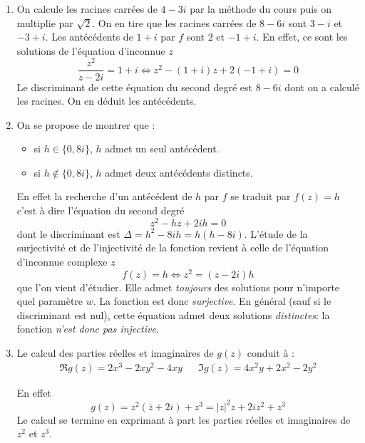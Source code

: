 \begin{enumerate}
 \item On calcule les racines carrées de $4-3i$ par la méthode du cours puis on multiplie par $\sqrt{2}$. On en tire que les racines carrées de $8-6i$ sont $3-i$ et $-3+i$.\newline
Les antécédents de $1+i$ par $f$ sont $2$ et $-1+i$.\newline
En effet, ce sont les solutions de l'équation d'inconnue $z$
\begin{displaymath}
 \frac{z^2}{z-2i}= 1+i \Leftrightarrow z^2 -(1+i)z +2(-1+i)=0
\end{displaymath}
Le discriminant de cette équation du second degré est $8-6i$ dont on a calculé les racines. On en déduit les antécédents.

\item On se propose de montrer que :
\begin{itemize}
 \item si $h\in\{0,8i\}$, $h$ admet un seul antécédent.
 \item si $h\not\in\{0,8i\}$, $h$ admet deux antécédents distincts.
\end{itemize}
En effet la recherche d'un antécédent de $h$ par $f$ se traduit par $f(z)=h$ c'est à dire l'équation du second degré
\begin{displaymath}
 z^2 -hz +2ih = 0
\end{displaymath}
dont le discriminant est $\Delta = h^2-8ih = h(h-8i)$.\newline
 L'étude de la surjectivité et de l'injectivité de la fonction revient à celle de l'équation d'inconnue complexe $z$
\begin{displaymath}
  f(z) = h \Leftrightarrow z^2 = (z-2i)h
\end{displaymath}
que l'on vient d'étudier. Elle admet \emph{toujours} des solutions pour n'importe quel paramètre $w$. La fonction est donc \emph{surjective}.\newline
En général (sauf si le discriminant est nul), cette équation admet deux solutions \emph{distinctes}: la fonction \emph{n'est donc pas injective}.

\item Le calcul des parties réelles et imaginaires de $g(z)$ conduit à :
\begin{align*}
 \Re g(z) =2x^3 -2xy^2-4xy & & \Im g(z) = 4x^2y +2x^2 -2y^2
\end{align*}

En effet
\begin{displaymath}
 g(z)= z^2(\overline{z}+2i)+z^3 = |z|^2z+2iz^2 +z^3
\end{displaymath}
Le calcul se termine en exprimant à part les parties réelles et imaginaires de $z^2$ et $z^3$.


\end{enumerate}
